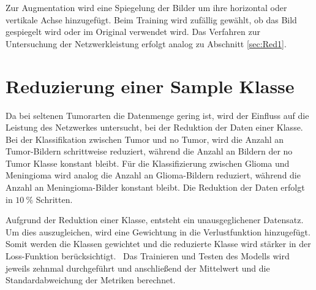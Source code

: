 Zur Augmentation wird eine Spiegelung der Bilder um ihre horizontal oder vertikale Achse hinzugefügt.
Beim Training wird zufällig gewählt, ob das Bild gespiegelt wird oder im Original verwendet wird.
Das Verfahren zur Untersuchung der Netzwerkleistung erfolgt analog zu Abschnitt \ref{sec:Red1}.    

\section{Reduzierung einer Sample Klasse}
Da bei seltenen Tumorarten die Datenmenge gering ist, wird der Einfluss auf die Leistung des Netzwerkes untersucht, 
bei der Reduktion der Daten einer Klasse.
Bei der Klassifikation zwischen Tumor und no Tumor, wird die Anzahl an Tumor-Bildern schrittweise reduziert, 
während die Anzahl an Bildern der no Tumor Klasse konstant bleibt.
Für die Klassifizierung zwischen Glioma und Meningioma wird analog die Anzahl an Glioma-Bildern reduziert, während die Anzahl an Meningioma-Bilder konstant bleibt.
Die Reduktion der Daten erfolgt in $\qty{10}{\%}$ Schritten. 

Aufgrund der Reduktion einer Klasse, entsteht ein unausgeglichener Datensatz.
Um dies auszugleichen, wird eine Gewichtung in die Verlustfunktion hinzugefügt.
Somit werden die Klassen gewichtet und die reduzierte Klasse wird stärker in der Loss-Funktion berücksichtigt.~\cite{pytorchCrossEntropy}
Das Trainieren und Testen des Modells wird jeweils zehnmal durchgeführt und anschließend der Mittelwert und die Standardabweichung der
Metriken berechnet.



